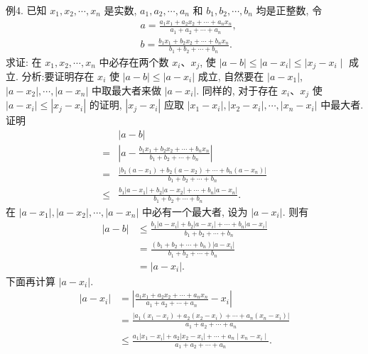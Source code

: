 例4. 已知 $x_1, x_2, \cdots, x_n$ 是实数, $a_1, a_2, \cdots, a_n$ 和 $b_1, b_2, \cdots, b_n$ 均是正整数, 令
$$
\begin{aligned}
& a=\frac{a_1 x_1+a_2 x_2+\cdots+a_n x_n}{a_1+a_2+\cdots+a_n}, \\
& b=\frac{b_1 x_1+b_2 x_2+\cdots+b_n x_n}{b_1+b_2+\cdots+b_n} .
\end{aligned}
$$
求证: 在 $x_1, x_2, \cdots, x_n$ 中必存在两个数 $x_i 、 x_j$, 使 $|a-b| \leqslant \mid a - x_i|\leqslant| x_j-x_i \mid$ 成立.
分析:要证明存在 $x_i$ 使 $|a-b| \leqslant\left|a-x_i\right|$ 成立, 自然要在 $\left|a-x_1\right|$, $\left|a-x_2\right|, \cdots,\left|a-x_n\right|$ 中取最大者来做 $\left|a-x_i\right|$. 同样的, 对于存在 $x_i 、 x_j$ 使 $\left|a-x_i\right| \leqslant\left|x_j-x_i\right|$ 的证明, $\left|x_j-x_i\right|$ 应取 $\left|x_1-x_i\right|,\left|x_2-x_i\right|, \cdots, \left|x_n-x_i\right|$ 中最大者.
证明
$$
\begin{aligned}
& |a-b| \\
= & \left|a-\frac{b_1 x_1+b_2 x_2+\cdots+b_n x_n}{b_1+b_2+\cdots+b_n}\right| \\
= & \frac{\left|b_1\left(a-x_1\right)+b_2\left(a-x_2\right)+\cdots+b_n\left(a-x_n\right)\right|}{b_1+b_2+\cdots+b_n} \\
\leqslant & \frac{b_1\left|a-x_1\right|+b_2\left|a-x_2\right|+\cdots+b_n\left|a-x_n\right|}{b_1+b_2+\cdots+b_n} .
\end{aligned}
$$
在 $\left|a-x_1\right|,\left|a-x_2\right|, \cdots,\left|a-x_n\right|$ 中必有一个最大者, 设为 $\left|a-x_i\right|$.
则有
$$
\begin{aligned}
|a-b| & \leqslant \frac{b_1\left|a-x_i\right|+b_2\left|a-x_i\right|+\cdots+b_n\left|a-x_i\right|}{b_1+b_2+\cdots+b_n} \\
& =\frac{\left(b_1+b_2+\cdots+b_n\right)\left|a-x_i\right|}{b_1+b_2+\cdots+b_n} \\
& =\left|a-x_i\right| .
\end{aligned}
$$
下面再计算 $\left|a-x_i\right|$.
$$
\begin{aligned}
\left|a-x_i\right| & =\left|\frac{a_1 x_1+a_2 x_2+\cdots+a_n x_n}{a_1+a_2+\cdots+a_n}-x_i\right| \\
& =\frac{\left|a_1\left(x_1-x_i\right)+a_2\left(x_2-x_i\right)+\cdots+a_n\left(x_n-x_i\right)\right|}{a_1+a_2+\cdots+a_n} \\
& \leqslant \frac{a_1\left|x_1-x_i\right|+a_2\left|x_2-x_i\right|+\cdots+a_n \mid x_n-x_i \mid}{a_1+a_2+\cdots+a_n} .
\end{aligned}
$$
